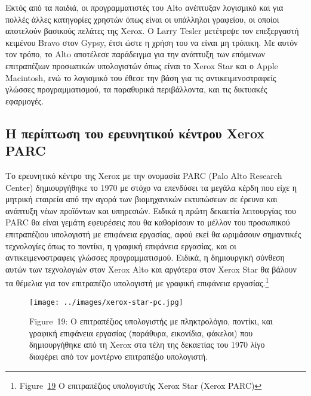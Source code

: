 \documentclass[
]{article}
\begin{document}
Εκτός από τα παιδιά, οι προγραμματιστές του Alto ανέπτυξαν λογισμικό και
για πολλές άλλες κατηγορίες χρηστών όπως είναι οι υπάλληλοι γραφείου, οι
οποίοι αποτελούν βασικούς πελάτες της Xerox. Ο Larry Tesler μετέτρεψε
τον επεξεργαστή κειμένου Bravo στον Gypsy, έτσι ώστε η χρήση του να
είναι μη τρόπικη. Με αυτόν τον τρόπο, το Alto αποτέλεσε παράδειγμα για
την ανάπτυξη των επόμενων επιτραπέζιων προσωπικών υπολογιστών όπως είναι
το Xerox Star και ο Apple Macintosh, ενώ το λογισμικό του έθεσε την βάση
για τις αντικειμενοστραφείς γλώσσες προγραμματισμού, τα παραθυρικά
περιβάλλοντα, και τις δικτυακές εφαρμογές.

\hypertarget{ux3b7-ux3c0ux3b5ux3c1ux3afux3c0ux3c4ux3c9ux3c3ux3b7-ux3c4ux3bfux3c5-ux3b5ux3c1ux3b5ux3c5ux3bdux3b7ux3c4ux3b9ux3baux3bfux3cd-ux3baux3adux3bdux3c4ux3c1ux3bfux3c5-xerox-parc}{%
\subsection{Η περίπτωση του ερευνητικού κέντρου Xerox
PARC}\label{ux3b7-ux3c0ux3b5ux3c1ux3afux3c0ux3c4ux3c9ux3c3ux3b7-ux3c4ux3bfux3c5-ux3b5ux3c1ux3b5ux3c5ux3bdux3b7ux3c4ux3b9ux3baux3bfux3cd-ux3baux3adux3bdux3c4ux3c1ux3bfux3c5-xerox-parc}}

Το ερευνητικό κέντρο της Xerox με την ονομασία PARC (Palo Alto Research
Center) δημιουργήθηκε το 1970 με στόχο να επενδύσει τα μεγάλα κέρδη που
είχε η μητρική εταιρεία από την αγορά των βιομηχανικών εκτυπώσεων σε
έρευνα και ανάπτυξη νέων προϊόντων και υπηρεσιών. Ειδικά η πρώτη
δεκαετία λειτουργίας του PARC θα είναι γεμάτη εφευρέσεις που θα
καθορίσουν το μέλλον του προσωπικού επιτραπέζιου υπολογιστή με επιφάνεια
εργασίας, αφού εκεί θα ωριμάσουν σημαντικές τεχνολογίες όπως το ποντίκι,
η γραφική επιφάνεια εργασίας, και οι αντικειμενοστραφεις γλώσσες
προγραμματισμού. Ειδικά, η δημιουργική σύνθεση αυτών των τεχνολογιών
στον Xerox Alto και αργότερα στον Xerox Star θα βάλουν τα θέμελια για
τον επιτραπέζιο υπολογιστή με γραφική επιφάνεια εργασίας.\footnote{Figure~\protect\hyperlink{fig:xerox-star-pc}{19}
  Ο επιτραπέζιος υπολογιστής Xerox Star (Xerox PARC)}

\leavevmode{}%
\begin{figure}
\hypertarget{fig:xerox-star-pc}{%
\centering
\texttt{[image: ../images/xerox-star-pc.jpg]}
\caption{Figure~19: Ο επιτραπέζιος υπολογιστής με πληκτρολόγιο, ποντίκι,
και γραφική επιφάνεια εργασίας (παράθυρα, εικονίδια, φάκελοι) που
δημιουργήθηκε από τη Xerox στα τέλη της δεκαετίας του 1970 λίγο διαφέρει
από τον μοντέρνο επιτραπέζιο υπολογιστή.}\label{fig:xerox-star-pc}
}
\end{figure}
\end{document}
